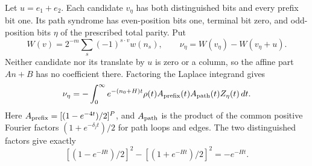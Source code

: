 Let $u=e_1+e_2$. Each candidate $v_\eta$ has both distinguished bits
and every prefix bit one. Its path syndrome has even-position bits
one, terminal bit zero, and odd-position bits $\eta$ of the prescribed
total parity. Put
\[
 W(v)=2^{-m}\sum_s(-1)^{s\cdot v}w(n_s),\qquad
 \nu_\eta=W(v_\eta)-W(v_\eta+u).
\]
Neither candidate nor its translate by $u$ is zero or a column, so the
affine part $An+B$ has no coefficient there. Factoring the Laplace
integrand gives
\begin{equation}\label{eq:cycle-cost}
 \nu_\eta=-\int_0^\infty e^{-(n_0+H)t}\rho(t)
       A_{\rm prefix}(t)A_{\rm path}(t)Z_\eta(t)\,dt.
\end{equation}
Here $A_{\rm prefix}=[(1-e^{-4t})/2]^P$, and $A_{\rm path}$ is the
product of the common positive Fourier factors
$(1+e^{-\delta_jt})/2$ for path loops and edges. The two distinguished
factors give exactly
\[
 [(1-e^{-Ht})/2]^2-[(1+e^{-Ht})/2]^2=-e^{-Ht}.
\]

